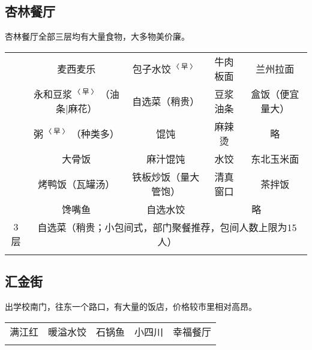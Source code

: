 \subsection[杏林餐厅]{杏林餐厅}
\vspace{-1em}
杏林餐厅全部三层均有大量食物，大多物美价廉。
\newpage
\begin{table}[ht]
    \centering
    \begin{tabular}{|c|c|c|c|c|}
        \Xhline{1.2pt}
        \multirow{3}{*}{1层} & 麦西麦乐                                                & 包子水饺$^{〈早〉}$ %
                            & 牛肉板面                                                & 兰州拉面         \\
        \cline{2-5}
                            & 永和豆浆$^{〈早〉}$（油条|麻花）                                 & 自选菜（稍贵）      %
                            & 豆浆油条                                                & 盒饭（便宜量大）     \\
        \cline{2-5}
                            & 粥$^{〈早〉}$（种类多）                                      & 馄饨           %
                            & 麻辣烫                                                 & 略            \\
        \Xhline{1.2pt}
        \multirow{3}{*}{2层} & 大骨饭                                                 & 麻汁馄饨         %
                            & 水饺                                                  & 东北玉米面        \\
        \cline{2-5}
                            & 烤鸭饭（瓦罐汤）                                            & 铁板炒饭（量大管饱）   %
                            & 清真窗口                                                & 茶拌饭          \\
        \cline{2-5}
                            & 馋嘴鱼                                                 & 自选水饺         %
                            & \multicolumn{2}{c|}{略}                                             \\
        \Xhline{1.2pt}
        3层\footnotemark     & \multicolumn{4}{c|}{自选菜（稍贵；小包间式，部门聚餐推荐，包间人数上限为15人）}                \\
        \Xhline{1.2pt}
    \end{tabular}
\end{table}

\subsection[汇金街]{汇金街\footnotemark}
出学校南门，往东一个路口，有大量的饭店，价格较市里相对高昂。
\begin{table}[ht]
    \centering
    \begin{tabular}{|c|c|c|c|c|}
        \Xhline{1.2pt}
        满江红 & 暖溢水饺 & 石锅鱼 & 小四川 & 幸福餐厅 \\
        \Xhline{1.2pt}
    \end{tabular}
\end{table}

